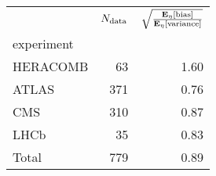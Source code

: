 \begin{center}
    \begin{tabular}{lrr}
        \toprule
        {} &  $N_{\rm data}$ &  $\sqrt{\frac{\mathbf{E}_{\eta}\left[ {\rm bias} \right]}{\mathbf{E}_{\eta}\left[ {\rm variance} \right]}}$ \\
        experiment &        &                      \\
        \midrule
        HERACOMB   &     63 &                 1.60 \\
        ATLAS      &    371 &                 0.76 \\
        CMS        &    310 &                 0.87 \\
        LHCb       &     35 &                 0.83 \\
        Total      &    779 &                 0.89 \\
        \bottomrule
        \end{tabular}
\end{center}